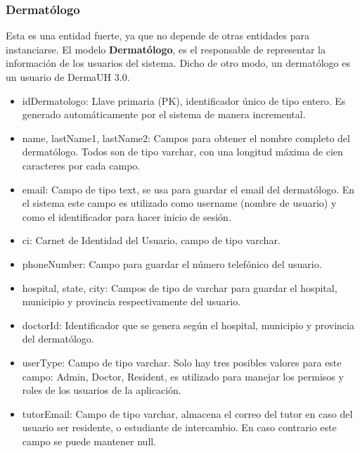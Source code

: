 \subsubsection{Dermat\'ologo}
Esta es una entidad fuerte, ya que no depende de otras entidades para instanciarse. El modelo
\textbf{Dermat\'ologo}, es el responsable de representar la informaci\'on de los usuarios del 
sistema. Dicho de otro modo, un dermat\'ologo es un usuario de DermaUH 3.0.
\begin{itemize}
    \item idDermatologo: Llave primaria (PK), identificador \'unico de tipo entero. Es generado autom\'aticamente por el sistema de manera incremental.
    \item name, lastName1, lastName2: Campos para obtener el nombre completo del dermat\'ologo. Todos son de tipo varchar, con una longitud m\'axima de cien caracteres por cada campo.
    \item email: Campo de tipo text, se usa para guardar el email del dermat\'ologo. En el sistema este campo es utilizado como username (nombre de usuario) y como el identificador para hacer inicio de sesi\'on.
    \item ci: Carnet de Identidad del Usuario, campo de tipo varchar.
    \item phoneNumber: Campo para guardar el n\'umero telef\'onico del usuario.
    \item hospital, state, city: Campos de tipo de varchar para guardar el hospital, municipio y provincia respectivamente del usuario.
    \item doctorId: Identificador que se genera seg\'un el hospital, municipio y provincia del dermat\'ologo.
    \item userType: Campo de tipo varchar. Solo hay tres posibles valores para este campo: Admin, Doctor, Resident, es utilizado para manejar los permisos y roles de los usuarios de la aplicaci\'on.
    \item tutorEmail: Campo de tipo varchar, almacena el correo del tutor en caso del usuario ser residente, o estudiante de intercambio. En caso contrario este campo se puede mantener null.
\end{itemize}

